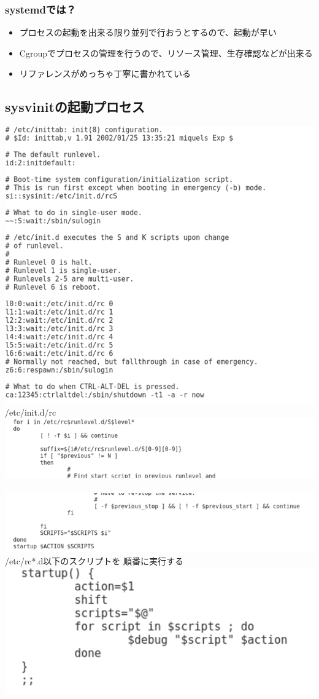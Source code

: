 \documentclass[mingoth,a4paper]{jsarticle}
\begin{document}
\subsubsection{systemdでは？}

\begin{itemize}
 \item プロセスの起動を出来る限り並列で行おうとするので、起動が早い
 \item Cgroupでプロセスの管理を行うので、リソース管理、生存確認などが出来る
 \item リファレンスがめっちゃ丁寧に書かれている
\end{itemize}

\subsection{sysvinitの起動プロセス}
\includegraphics[keepaspectratio,width=0.5\hsize]{image201905-kansai/initboot01_gray.png}
 \\
/etc/init.d/rc
 \\
\includegraphics[keepaspectratio,width=0.7\hsize]{image201905-kansai/initboot02_gray.png}
 \\
 \\
\includegraphics[keepaspectratio,width=0.7\hsize]{image201905-kansai/initboot03_gray.png}
 \\
/etc/rc*.d以下のスクリプトを
順番に実行する
 \\
\includegraphics[keepaspectratio,width=0.4\hsize]{image201905-kansai/initboot04_gray.png}
\end{document}
